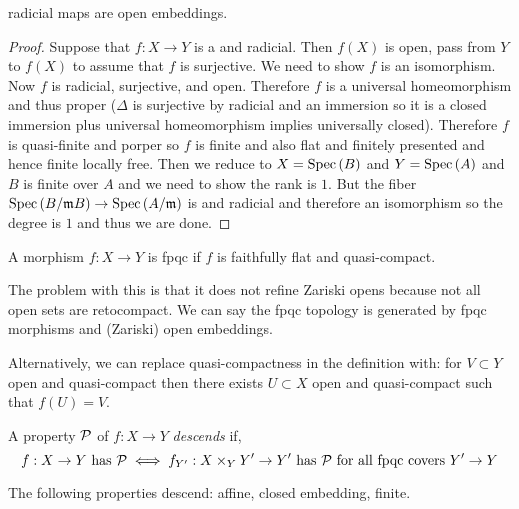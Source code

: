 \documentclass[12pt]{article}
\begin{document}
\begin{thm}
\etale radicial maps are open embeddings.
\end{thm}

\begin{proof}
Suppose that $f : X \to Y$ is a \etale and radicial. Then $f(X)$ is open, pass from $Y$ to $f(X)$ to assume that $f$ is surjective. We need to show $f$ is an isomorphism. Now $f$ is radicial, surjective, and open. Therefore $f$ is a universal homeomorphism and thus proper ($\Delta$ is surjective by radicial and an immersion so it is a closed immersion plus universal homeomorphism implies universally closed). Therefore $f$ is quasi-finite and porper so $f$ is finite and also flat and finitely presented and hence finite locally free. Then we reduce to $X = \mathrm{Spec}\left( B \right)$ and $Y = \mathrm{Spec}\left( A \right)$ and $B$ is finite over $A$ and we need to show the rank is $1$. But the fiber $\mathrm{Spec}\left( B / \mathfrak{m} B \right) \to \mathrm{Spec}\left( A / \mathfrak{m} \right)$ is \etale and radicial and therefore an isomorphism so the degree is $1$ and thus we are done. 
\end{proof}

\begin{defn}
A morphism $f : X \to Y$ is fpqc if $f$ is faithfully flat and quasi-compact. 
\end{defn}

\begin{rmk}
The problem with this is that it does not refine Zariski opens because not all open sets are retocompact. We can say the fpqc topology is generated by fpqc morphisms and (Zariski) open embeddings.
\end{rmk}

\begin{rmk}
Alternatively, we can replace quasi-compactness in the definition with: for $V \subset Y$ open and quasi-compact then there exists $U \subset X$ open and quasi-compact such that $f(U) = V$. 
\end{rmk}

\begin{defn}
A property $\mathcal{P}$ of $f : X \to Y$ \textit{descends} if,
\[ f : X \to Y \text{ has } \mathcal{P} \iff f_{Y'} : X \times_Y Y' \to Y' \text{ has } \mathcal{P} \text{ for all fpqc covers } Y' \to Y \]
\end{defn}

\begin{prop}
The following properties descend: affine, closed embedding, finite.
\end{prop}
\end{document}
